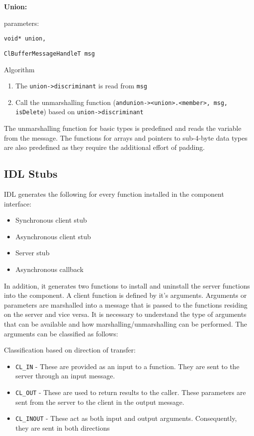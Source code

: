 \begin{flushleft}
\textbf{Union:}\par
parameters:\par
{\tt{void* union,}}\par
{\tt{ClBufferMessageHandleT msg}}\par
Algorithm
\begin{enumerate}
\item
The {\tt{union->discriminant}} is read from {\tt{msg}}
\item
Call the unmarshalling function ({\tt{andunion-><union>.<member>, msg, isDelete}}) based on {\tt{union->discriminant}} 
\end{enumerate}

The unmarshalling function for basic types is predefined and reads the variable from the message. The functions for arrays and pointers to sub-4-byte 
data types are also predefined as they require the additional effort of padding.

\subsection{IDL Stubs}
IDL generates the following for every function installed in the component interface:
\begin{itemize}
\item
Synchronous client stub
\item
Asynchronous client stub
\item
Server stub
\item
Asynchronous callback
\end{itemize}

In addition, it generates two functions to install and uninstall the server functions into the component. A client function is defined by it's arguments.
Arguments or parameters are marshalled into a message that is passed to the functions residing on the server and vice versa. It is 
necessary to understand the type of arguments that can be available and how marshalling/unmarshalling can be performed. 
The arguments can be classified as follows:
\par
Classification based on direction of transfer:
\begin{itemize}
\item
{\tt{CL\_\-IN}} - These are provided as an input to a function. They are sent to the server through an input message.
\item
{\tt{CL\_\-OUT}} - These are used to return results to the caller. These parameters are sent from the server to the client in the output message.
\item
{\tt{CL\_\-INOUT}} - These act as both input and output arguments. Consequently, they are sent in both directions
\end{itemize}


\end{flushleft}
